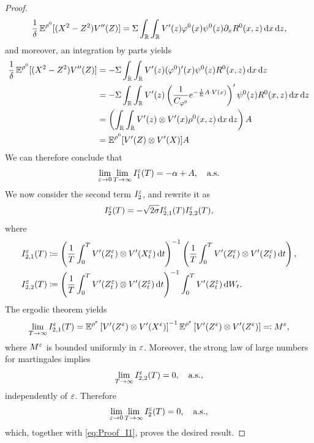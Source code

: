 \documentclass[10pt]{article}
\begin{document}
\begin{proof}
\begin{equation}\label{eq:final_result}
	\frac{1}{\delta} \operatorname{\mathbb{E}}^{\rho^0}[(X^2 - Z^2)V''(Z)] = \Sigma \int_{\mathbb{R}} \int_{\mathbb{R}} V'(z) \varphi^0(x) \psi^0(z) \partial_x R^0(x,z) \,\mathrm{d} x \,\mathrm{d} z,
\end{equation}
and moreover, an integration by parts yields
\begin{equation}
\begin{aligned}
	\frac{1}{\delta} \operatorname{\mathbb{E}}^{\rho^0}[(X^2 - Z^2)V''(Z)] &= -\Sigma \int_{\mathbb{R}} \int_{\mathbb{R}} V'(z) (\varphi^0)'(x) \psi^0(z) R^0(x,z) \,\mathrm{d} x \,\mathrm{d} z\\
	&= -\Sigma \int_{\mathbb{R}} \int_{\mathbb{R}} V'(z) \left ( \frac{1}{C_{\varphi^0}} e^{-\frac{1}{\Sigma} A\cdot V(x)} \right )' \psi^0(z) R^0(x,z) \,\mathrm{d} x \,\mathrm{d} z \\
	&= \left(\int_{\mathbb{R}} \int_{\mathbb{R}} V'(z) \otimes V'(x) \rho^0(x,z) \,\mathrm{d} x \,\mathrm{d} z\right)A\\
	&=  \operatorname{\mathbb{E}}^{\rho^0} [ V'(Z) \otimes V'(X) ]A
\end{aligned}
\end{equation}
We can therefore conclude that
\begin{equation}\label{eq:Proof_I1}
\lim_{\varepsilon \to 0} \lim_{T \to \infty} I_1^\varepsilon(T) = -\alpha + A, \quad \text{a.s.}
\end{equation}
We now consider the second term $I_2^\varepsilon$, and rewrite it as
\begin{equation}
	I^\varepsilon_2(T) = -\sqrt{2\sigma} I_{2,1}^\varepsilon(T)  I_{2,2}^\varepsilon(T),
\end{equation}
where
\begin{equation}
\begin{aligned}
	I_{2,1}^\varepsilon(T) &\coloneqq \left(\frac{1}{T} \int_0^T V'(Z^\varepsilon_t) \otimes V'(X^\varepsilon_t) \,\mathrm{d} t\right)^{-1}\left(\frac{1}{T} \int_0^T V'(Z^\varepsilon_t) \otimes V'(Z^\varepsilon_t) \,\mathrm{d} t\right),\\
	I_{2,2}^\varepsilon(T) &\coloneqq \left(\frac{1}{T} \int_0^T V'(Z^\varepsilon_t) \otimes V'(Z^\varepsilon_t) \,\mathrm{d} t\right)^{-1}\int_0^T V'(Z^\varepsilon_t) \,\mathrm{d} W_t.
\end{aligned}
\end{equation}
The ergodic theorem yields
\begin{equation}
	\lim_{T \to \infty} I_{2,1}^\varepsilon(T) = \operatorname{\mathbb{E}}^{\rho^\varepsilon}\left[V'(Z^\varepsilon) \otimes V'(X^\varepsilon)\right]^{-1}\operatorname{\mathbb{E}}^{\rho^\varepsilon}\left[V'(Z^\varepsilon) \otimes V'(Z^\varepsilon)\right] \eqqcolon M^\varepsilon,
\end{equation}
where $M^\varepsilon$ is bounded uniformly in $\varepsilon$. Moreover, the strong law of large numbers for martingales implies
\begin{equation}
	\lim_{T \to \infty} I_{2,2}^\varepsilon(T) = 0, \quad \text{a.s.},
\end{equation}
independently of $\varepsilon$. Therefore
\begin{equation}
	\lim_{\varepsilon \to 0}\lim_{T \to \infty} I_2^\varepsilon(T) = 0, \quad \text{a.s.},
\end{equation}
which, together with \eqref{eq:Proof_I1}, proves the desired result.
\end{proof}
\end{document}
